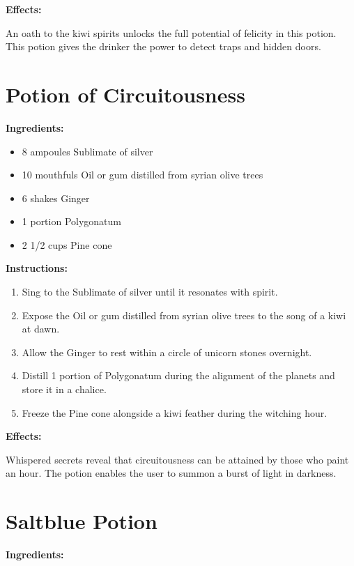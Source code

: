 \documentclass{article}
\begin{document}
\textbf{Effects:}

An oath to the kiwi spirits unlocks the full potential of felicity in this potion. This potion gives the drinker the power to detect traps and hidden doors.

\newpage
\section*{Potion of Circuitousness}

\textbf{Ingredients:}

\begin{itemize}
  \item 8 ampoules Sublimate of silver
  \item 10 mouthfuls Oil or gum distilled from syrian olive trees
  \item 6 shakes Ginger
  \item 1 portion Polygonatum
  \item 2 1/2 cups Pine cone
\end{itemize}

\textbf{Instructions:}

\begin{enumerate}
  \item Sing to the Sublimate of silver until it resonates with spirit.
  \item Expose the Oil or gum distilled from syrian olive trees to the song of a kiwi at dawn.
  \item Allow the Ginger to rest within a circle of unicorn stones overnight.
  \item Distill 1 portion of Polygonatum during the alignment of the planets and store it in a chalice.
  \item Freeze the Pine cone alongside a kiwi feather during the witching hour.
\end{enumerate}

\textbf{Effects:}

Whispered secrets reveal that circuitousness can be attained by those who paint an hour. The potion enables the user to summon a burst of light in darkness.

\newpage
\section*{Saltblue Potion}

\textbf{Ingredients:}
\end{document}

